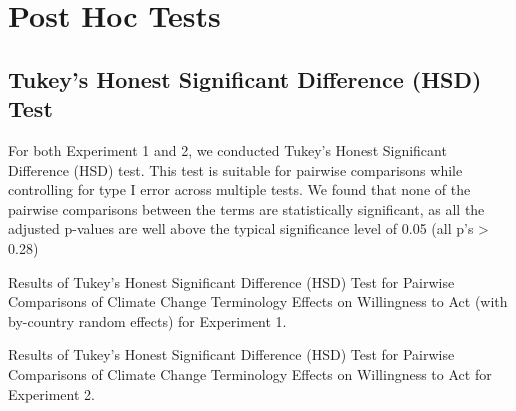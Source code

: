        \section{Post Hoc Tests}

    \subsection{Tukey’s Honest Significant Difference (HSD) Test}

For both Experiment 1 and 2, we conducted Tukey’s Honest Significant Difference (HSD) test. This test is suitable for pairwise comparisons while controlling for type I error across multiple tests. We found that none of the pairwise comparisons between the terms are statistically significant, as all the adjusted p-values are well above the typical significance level of 0.05 (all p’s > 0.28)

\begin{table}[H] 
\caption{Results of Tukey’s Honest Significant Difference (HSD) Test for Pairwise Comparisons of Climate Change Terminology Effects on Willingness to Act (with by-country random effects) for Experiment 1.}
 
\end{table}

\begin{table}[H] 
\caption{Results of Tukey’s Honest Significant Difference (HSD) Test for Pairwise Comparisons of Climate Change Terminology Effects on Willingness to Act for Experiment 2.}
 
\end{table}

